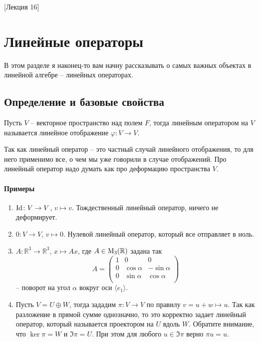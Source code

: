 [Лекция 16]


\newpage
\section{Линейные операторы}

В этом разделе я наконец-то вам начну рассказывать о самых важных объектах в линейной алгебре -- линейных операторах.

\subsection{Определение и базовые свойства}
\label{section::LinearOpDef}

\begin{definition}
Пусть $V$ -- векторное пространство над полем $F$, тогда линейным оператором на $V$ называется линейное отображение $\varphi \colon V\to V$.
\end{definition}

Так как линейный оператор -- это частный случай линейного отображения, то для него применимо все, о чем мы уже говорили в случае отображений.
Про линейный оператор надо думать как про деформацию пространства $V$.

\paragraph{Примеры}

\begin{enumerate}
\item $\operatorname{Id}\colon V\to V$, $v\mapsto v$.
Тождественный линейный оператор, ничего не деформирует.

\item $0\colon V\to V$, $v \mapsto 0$.
Нулевой линейный оператор, который все отправляет в ноль.

\item $A\colon \mathbb R^3 \to \mathbb R^3$, $x\mapsto Ax$, где $A\in \operatorname{M}_{3}(\mathbb R)$ задана так
\[
A = 
\begin{pmatrix}
{1}&{0}&{0}\\
{0}&{\cos \alpha}&{-\sin \alpha}\\
{0}&{\sin \alpha}&{\cos \alpha}\\
\end{pmatrix}
\]
-- поворот на угол $\alpha$ вокруг оси $\langle e_1\rangle$.

\item Пусть $V = U\oplus W$, тогда зададим $\pi\colon V\to V$ по правилу $v = u + w \mapsto u$.
Так как разложение в прямой сумме однозначно, то это корректно задает линейный оператор, который называется проектором на $U$ вдоль $W$.
Обратите внимание, что $\ker \pi = W$ и $\Im \pi = U$.
При этом для любого $u\in \Im\pi$ верно $\pi u = u$.
\end{enumerate}

